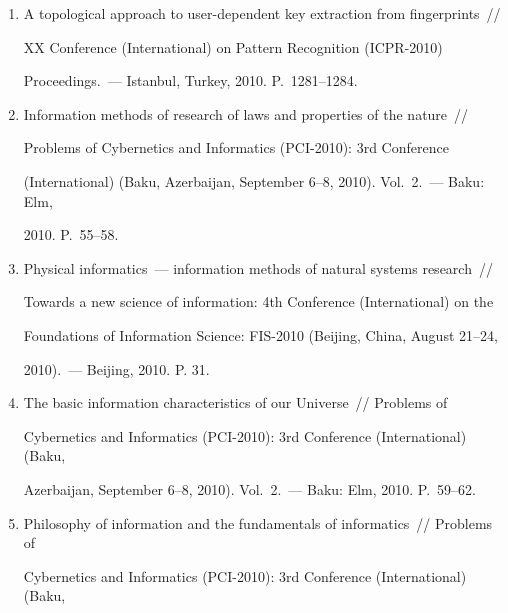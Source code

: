 \begin{enumerate}[1.]
and verification~/\!\!/  Problems of Cybernetics and Informatics (PCI-2010): 


3rd Conference (International) (Baku, Azerbaijan, September 6--8, 2010). 


Vol.~1.~--- Baku: Elm, 2010. P.~56--58.


\item {}


A topological approach to user-dependent key extraction from fingerprints~/\!\!/  


XX Conference (International) on Pattern Recognition (ICPR-2010) 


Proceedings.~--- Istanbul, Turkey, 2010. P.~1281--1284.


\item {}


Information methods of research of laws and properties of the nature~/\!\!/  


Problems of Cybernetics and Informatics (PCI-2010): 3rd Conference 


(International) (Baku, Azerbaijan, September 6--8, 2010). Vol.~2.~--- Baku: Elm, 


2010. P.~55--58. 


\item {}


Physical informatics~--- information methods of natural systems research~/\!\!/  


Towards a new science of information: 4th Conference (International) on the 


Foundations of Information Science: FIS-2010 (Beijing, China, August  21--24,


2010).~--- Beijing, 2010. P. 31.


\item{}


The basic information characteristics of our Universe~/\!\!/  Problems of 


Cybernetics and Informatics (PCI-2010): 3rd Conference (International) (Baku, 


Azerbaijan, September 6--8, 2010). Vol.~2.~--- Baku: Elm, 2010. P.~59--62.


\item {}


Philosophy of information and the fundamentals of informatics~/\!\!/  Problems of 


Cybernetics and Informatics (PCI-2010): 3rd Conference (International) (Baku, 



\end{enumerate}
